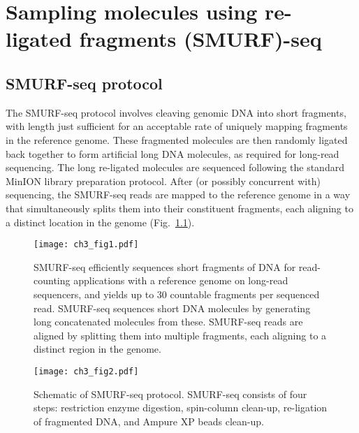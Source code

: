 \chapter{Sampling molecules using re-ligated fragments (SMURF)-seq}
\label{ch3}


\section{SMURF-seq protocol}
The SMURF-seq protocol involves cleaving genomic DNA into short
fragments, with length just sufficient for an acceptable rate of
uniquely mapping fragments in the reference genome.  These fragmented
molecules are then randomly ligated back together to form artificial
long DNA molecules, as required for long-read sequencing. The long
re-ligated molecules are sequenced following the standard MinION library
preparation protocol. After (or possibly concurrent with) sequencing,
the SMURF-seq reads are mapped to the reference genome in a way that
simultaneously splits them into their constituent fragments, each
aligning to a distinct location in the genome (Fig.~\ref{smurf}).

\begin{figure}[b!]
\centering
\texttt{[image: ch3\_fig1.pdf]}
\caption{
  SMURF-seq efficiently sequences short fragments of DNA for
  read-counting applications with a reference genome on long-read
  sequencers, and yields up to 30 countable fragments per sequenced read.
  SMURF-seq sequences short DNA molecules by generating long concatenated
  molecules from these.  SMURF-seq reads are aligned by splitting them
  into multiple fragments, each aligning to a distinct region in the
  genome.}
\label{smurf}
\end{figure}


\begin{figure}[t!]
\centering
\texttt{[image: ch3\_fig2.pdf]}
\caption{Schematic of SMURF-seq protocol. SMURF-seq consists of four
  steps: restriction enzyme digestion, spin-column clean-up, re-ligation
  of fragmented DNA, and Ampure XP beads clean-up.}
\label{protocol}
\end{figure}

